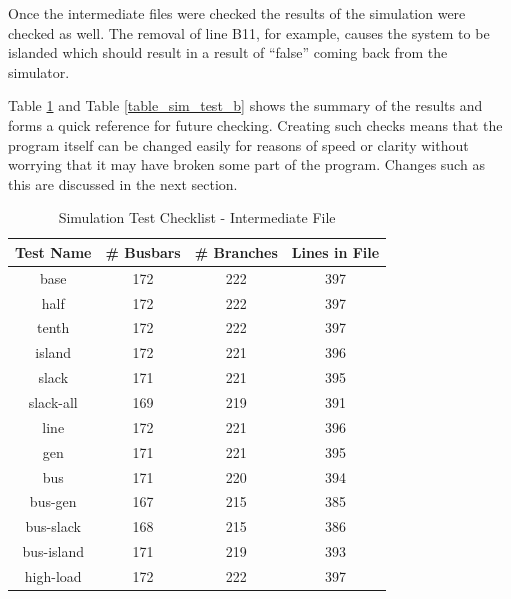 \documentclass[a4paper,oneside,12pt]{report}
\begin{document}
Once the intermediate files were checked the results of the simulation
were checked as well. The removal of line B11, for example, causes the
system to be islanded which should result in a result of ``false''
coming back from the simulator.

Table \ref{table_sim_test_a} and Table \ref{table_sim_test_b} shows the summary of the results and forms a quick
reference for future checking. Creating such checks means that the program itself can be changed easily for
reasons of speed or clarity without worrying that it may have broken some part of the program. Changes such as this are discussed in the next section.

\begin{table}[htbp]
\caption{Simulation Test Checklist - Intermediate File}
\label{table_sim_test_a}
\centering
\begin{tabular}{c||c||c||c}
\bfseries Test Name & \bfseries \# Busbars & \bfseries \# Branches & \bfseries Lines in File \\
\hline \hline
base      & 172& 222     & 397 \\
half      & 172& 222     & 397 \\
tenth     & 172& 222     & 397 \\
island    & 172& 221     & 396 \\
slack     & 171& 221     & 395 \\
slack-all & 169& 219     & 391 \\
line      & 172& 221     & 396 \\
gen       & 171& 221     & 395 \\
bus       & 171& 220     & 394 \\
bus-gen   & 167& 215     & 385 \\
bus-slack & 168& 215     & 386 \\
bus-island& 171& 219     & 393 \\
high-load & 172& 222     & 397 \\
\hline
\end{tabular}\\
\end{table}
\end{document}
